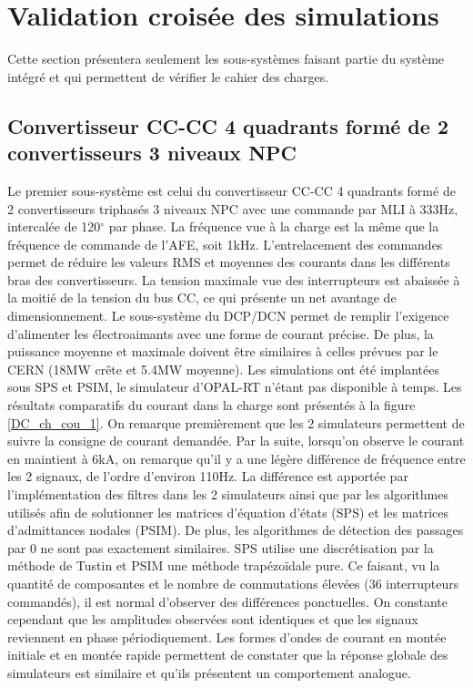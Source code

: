 \chapter{Validation croisée des simulations}
Cette section présentera seulement les sous-systèmes faisant partie du système intégré et qui permettent de vérifier le cahier des charges.

\section{Convertisseur CC-CC 4 quadrants formé de 2 convertisseurs 3 niveaux NPC}

Le premier sous-système est celui du convertisseur CC-CC 4 quadrants formé de 2 convertisseurs triphasés 3 niveaux NPC avec une commande par MLI à 333Hz, intercalée de 120$^\circ$ par phase. La fréquence vue à la charge est la même que la fréquence de commande de l'AFE, soit 1kHz. L'entrelacement  des commandes permet de réduire les valeurs RMS et moyennes des courants dans les différents bras des convertisseurs. La tension maximale vue des interrupteurs est abaissée à la moitié de la tension du bus CC, ce qui présente un net avantage de dimensionnement. Le sous-système du DCP/DCN permet de remplir l'exigence d'alimenter les électroaimants avec une forme de courant précise. De plus, la puissance moyenne et maximale doivent être similaires à celles prévues par le CERN (18MW crête et 5.4MW moyenne). Les simulations ont été implantées sous SPS et PSIM, le simulateur d'OPAL-RT n'étant pas disponible à temps. Les résultats comparatifs du courant dans la charge sont présentés à la figure \ref{DC_ch_cou_1}. On remarque premièrement que les 2 simulateurs permettent de suivre la consigne de courant demandée. Par la suite, lorsqu'on observe le courant en maintient à 6kA, on remarque qu'il y a une légère différence de fréquence entre les 2 signaux, de l'ordre d'environ 110Hz. La différence est apportée par l'implémentation des filtres dans les 2 simulateurs ainsi que par les algorithmes utilisés afin de solutionner les matrices d'équation d'états (SPS) et les matrices d'admittances nodales (PSIM). De plus, les algorithmes de détection des passages par 0 ne sont pas exactement similaires. SPS utilise une discrétisation par la méthode de Tustin et PSIM une méthode trapézoïdale pure. Ce faisant, vu la quantité de composantes et le nombre de commutations élevées (36 interrupteurs commandés), il est normal d'observer des différences ponctuelles. On constante cependant que les amplitudes observées sont identiques et que les signaux reviennent en phase périodiquement. Les formes d'ondes de courant en montée initiale et en montée rapide permettent de constater que la réponse globale des simulateurs est similaire et qu'ils présentent un comportement analogue.

